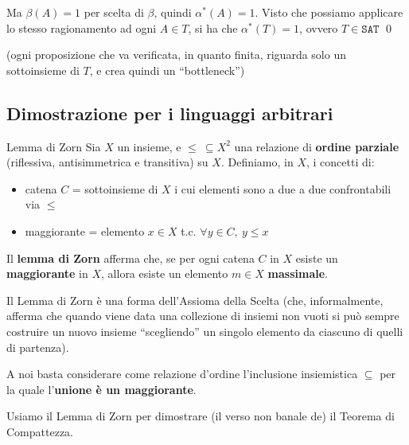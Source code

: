 \documentclass[a4paper,11pt]{report}
\begin{document}
Ma \( \beta(A) = 1 \) per scelta di \( \beta \), quindi \( \alpha^*(A) = 1 \). Visto che possiamo applicare lo stesso ragionamento ad ogni \( A \in T \), si ha che \( \alpha^*(T) = 1 \), ovvero \( T \in \texttt{SAT} \) \qed

{\small \color{gray}(ogni proposizione che va verificata, in quanto finita, riguarda solo un sottoinsieme di \(T  \), e crea quindi un ``bottleneck'')}

\subsection{Dimostrazione per i linguaggi arbitrari}

\begin{lemmaframe}{Lemma di Zorn}{}
    Sia \( X \) un insieme, e \( \leq \ \subseteq X^2 \) una relazione di \textbf{ordine parziale} (riflessiva, antisimmetrica e transitiva) su \( X \). 
    Definiamo, in \( X \), i concetti di:
    \begin{itemize}
        \item catena \( C \) = sottoinsieme di \( X \) i cui elementi sono a due a due confrontabili via \( \leq  \)
        \item maggiorante = elemento \( x \in X \) t.c. \( \forall y \in C, \ y\leq x \)
    \end{itemize}
    Il \textbf{lemma di Zorn} afferma che, se per ogni catena \( C \) in \( X \) esiste un \textbf{maggiorante} in \( X \), allora esiste un elemento \( m \in X \) \textbf{massimale}.
\end{lemmaframe}

{\color{CadetBlue}Il Lemma di Zorn è una forma dell'Assioma della Scelta (che, informalmente, afferma che quando viene data una collezione di insiemi non vuoti si può sempre costruire un nuovo insieme ``scegliendo'' un singolo elemento da ciascuno di quelli di partenza).}

A noi basta considerare come relazione d'ordine l'inclusione insiemistica \( \subseteq \) per la quale l'\textbf{unione è un maggiorante}.

Usiamo il Lemma di Zorn per dimostrare (il verso non banale de) il Teorema di Compattezza.
\end{document}

